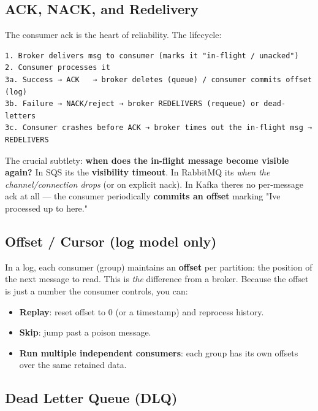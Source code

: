 \documentclass[11pt]{article}
\providecommand{\tightlist}{\setlength{\itemsep}{1pt}\setlength{\parskip}{0pt}}
\begin{document}
\subsection{ACK, NACK, and Redelivery}\label{ack-nack-and-redelivery}

The consumer ack is the heart of reliability. The lifecycle:

\setcodelang{}

\begin{verbatim}
1. Broker delivers msg to consumer (marks it "in-flight / unacked")
2. Consumer processes it
3a. Success → ACK   → broker deletes (queue) / consumer commits offset (log)
3b. Failure → NACK/reject → broker REDELIVERS (requeue) or dead-letters
3c. Consumer crashes before ACK → broker times out the in-flight msg → REDELIVERS
\end{verbatim}

The crucial subtlety: \textbf{when does the in-flight message become visible again?} In SQS it\textquotesingle s the \textbf{visibility timeout}. In RabbitMQ it\textquotesingle s \emph{when the channel/connection drops} (or on explicit nack). In Kafka there\textquotesingle s no per-message ack at all --- the consumer periodically \textbf{commits an offset} marking "I\textquotesingle ve processed up to here."

\subsection{Offset / Cursor (log model only)}\label{offset--cursor-log-model-only}

In a log, each consumer (group) maintains an \textbf{offset} per partition: the position of the next message to read. This is \emph{the} difference from a broker. Because the offset is just a number the consumer controls, you can:

\begin{itemize}
\tightlist
\item
  \textbf{Replay}: reset offset to 0 (or a timestamp) and reprocess history.
\item
  \textbf{Skip}: jump past a poison message.
\item
  \textbf{Run multiple independent consumers}: each group has its own offsets over the same retained data.
\end{itemize}

\subsection{Dead Letter Queue (DLQ)}\label{dead-letter-queue-dlq}
\end{document}
